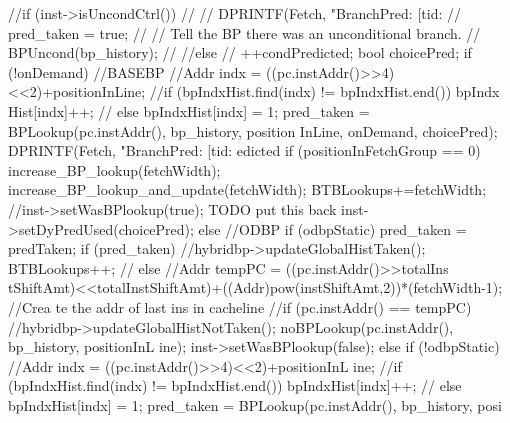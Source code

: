 \begin{DoxyCode}
{    //if (inst->isUncondCtrl())
    //{
    //    DPRINTF(Fetch, "BranchPred: [tid:%
    //    pred_taken = true;
    //    // Tell the BP there was an unconditional branch.
    //    BPUncond(bp_history);
    //}
    //else
    //{
      ++condPredicted;
                bool choicePred;
        if (!onDemand) { //BASEBP
                        //Addr indx = ((pc.instAddr()>>4)<<2)+positionInLine;
                        //if (bpIndxHist.find(indx) != bpIndxHist.end()) { bpIndx
      Hist[indx]++;
                        //} else { bpIndxHist[indx] = 1; }
                        pred_taken = BPLookup(pc.instAddr(), bp_history, position
      InLine, onDemand, choicePred);
                        DPRINTF(Fetch, "BranchPred: [tid:%
      edicted %
                        if (positionInFetchGroup == 0) {
                                increase_BP_lookup(fetchWidth);
                                increase_BP_lookup_and_update(fetchWidth);
                                BTBLookups+=fetchWidth;
                        }
                        //inst->setWasBPlookup(true); TODO put this back
                        inst->setDyPredUsed(choicePred);
        } else { //ODBP
                        if (odbpStatic)
                        {
                            pred_taken = predTaken;
                                if (pred_taken) {
                                        //hybridbp->updateGlobalHistTaken();
                                        BTBLookups++;
                                //} else {
                                        //Addr tempPC = ((pc.instAddr()>>totalIns
      tShiftAmt)<<totalInstShiftAmt)+((Addr)pow(instShiftAmt,2))*(fetchWidth-1); //Crea
      te the addr of last ins in cacheline
                                        //if (pc.instAddr() == tempPC)
                                        //hybridbp->updateGlobalHistNotTaken();
                                }
                                noBPLookup(pc.instAddr(), bp_history, positionInL
      ine);
                                inst->setWasBPlookup(false);
                        }
                        else if (!odbpStatic)
                        {
                                //Addr indx = ((pc.instAddr()>>4)<<2)+positionInL
      ine;
                                //if (bpIndxHist.find(indx) != bpIndxHist.end()) 
      { bpIndxHist[indx]++;
                                //} else { bpIndxHist[indx] = 1; }
                            pred_taken = BPLookup(pc.instAddr(), bp_history, posi
}}}}
\end{DoxyCode}
